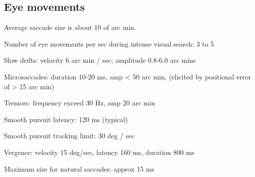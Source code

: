 \subsection*{Eye movements}

\be

\item Average saccade size is about 10 of arc min.  

\item Number of eye movements per sec during intense visual search: 3 to 5 

\item Slow drifts: velocity 6 arc min / sec; amplitude 0.8-6.0 arc mins

\item Microsaccades: duration 10-20 ms, amp < 50 arc min, (elicited by
positional error of > 15 arc min)

\item Tremors: frequency exceed 30 Hz, amp 20 arc min

\item Smooth pursuit latency: 120 ms (typical)

\item Smooth pursuit tracking limit: 30 deg / sec

\item Vergence: velocity 15 deg/sec, latency 160 ms, duration 800 ms

\item Maximum size for natural saccades: approx 15 ms
\ee


